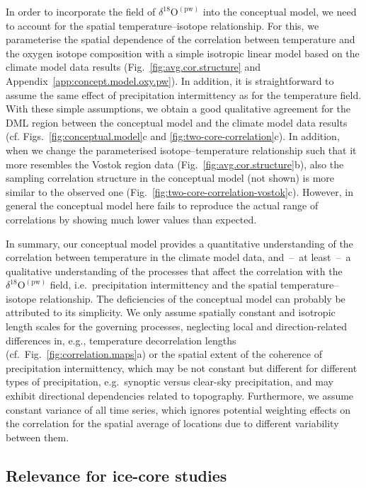 \documentclass[cp, manuscript]{copernicus}
\begin{document}
In order to incorporate the field of $\delta^{18}\mathrm{O}^{\mathrm{(pw)}}$
into the conceptual model, we need to account for the spatial
temperature--isotope relationship. For this, we parameterise the spatial
dependence of the correlation between temperature and the oxygen isotope
composition with a simple isotropic linear model based on the climate model data
results (Fig.~\ref{fig:avg.cor.structure} and
Appendix~\ref{app:concept.model.oxy.pw}). In addition, it is straightforward to
assume the same effect of precipitation intermittency as for the temperature
field. With these simple assumptions, we obtain a good qualitative agreement for
the DML region between the conceptual model and the climate model data results
(cf. Figs.~\ref{fig:conceptual.model}c and \ref{fig:two-core-correlation}c). In
addition, when we change the parameterised isotope--temperature relationship
such that it more resembles the Vostok region data
(Fig.~\ref{fig:avg.cor.structure}b), also the sampling correlation structure in
the conceptual model (not shown) is more similar to the observed one
(Fig.~\ref{fig:two-core-correlation-vostok}c). However, in general the
conceptual model here fails to reproduce the actual range of correlations by
showing much lower values than expected.

In summary, our conceptual model provides a quantitative understanding of the
correlation between temperature in the climate model data, and~--~at least~--~a
qualitative understanding of the processes that affect the correlation with the
$\delta^{18}\mathrm{O}^{\mathrm{(pw)}}$ field, i.e.\ precipitation intermittency
and the spatial temperature--isotope relationship. The deficiencies of the
conceptual model can probably be attributed to its simplicity. We only assume
spatially constant and isotropic length scales for the governing processes,
neglecting local and direction-related differences in, e.g., temperature
decorrelation lengths (cf.~Fig.~\ref{fig:correlation.maps}a) or the spatial
extent of the coherence of precipitation intermittency, which may be not
constant but different for different types of precipitation, e.g.\ synoptic
versus clear-sky precipitation, and may exhibit directional dependencies
related to topography. Furthermore, we assume constant variance of all
time series, which ignores potential weighting effects on the correlation for
the spatial average of locations due to different variability between them.

\subsection{Relevance for ice-core studies}
\label{discussion:relevance}
\end{document}
